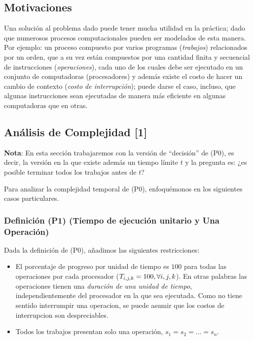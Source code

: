 \documentclass[14pt]{extarticle}
\begin{document}
\subsection*{Motivaciones}

Una solución al problema dado puede tener mucha utilidad en la práctica; dado que numerosos procesos computacionales pueden ser modelados de esta manera. Por ejemplo: un proceso compuesto por varios programas (\textit{trabajos}) relacionados por un orden, que a su vez están compuestos por una cantidad finita y secuencial de instrucciones (\textit{operaciones}), cada uno de los cuales debe ser ejecutado en un conjunto de computadoras (procesadores) y además existe el costo de hacer un cambio de contexto (\textit{costo de interrupción}); puede darse el caso, incluso, que algunas instrucciones sean ejecutadas de manera más eficiente en algunas computadoras que en otras.

\subsection*{Análisis de Complejidad [1]}

\textbf{Nota}: En esta sección trabajaremos con la versión de ``decisión'' de (P0), es decir, la versión en la que existe además un tiempo límite $t$ y la pregunta es: ¿es posible terminar todos los trabajos antes de $t$?

Para analizar la complejidad temporal de (P0), enfoquémonos en los siguientes casos particulares.

\subsubsection*{Definición (P1) (Tiempo de ejecución unitario y Una Operación)}

Dada la definición de (P0), añadimos las siguientes restricciones:

\begin{itemize}
    \item El porcentaje de progreso por unidad de tiempo es $100$ para todas las operaciones por cada procesador ($T_{i, j, k} = 100, \space \forall i, j, k$). En otras palabras las operaciones tienen una \textit{duración de una unidad de tiempo}, independientemente del procesador en la que sea ejecutada. Como no tiene sentido interrumpir una operacion, se puede asumir que los costos de interrupcion son despreciables.
    \item Todos los trabajos presentan solo una operación, $s_1 = s_2 = \ldots = s_n$.
\end{itemize}
\end{document}
